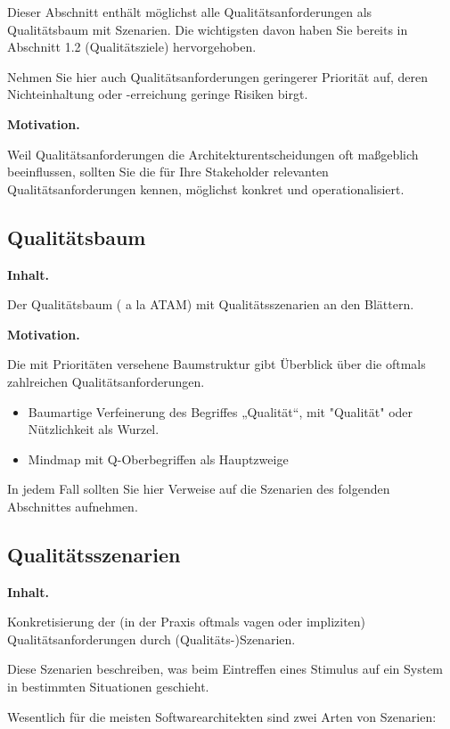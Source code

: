 \documentclass[]{article}
\begin{document}
Dieser Abschnitt enthält möglichst alle Qualitätsanforderungen als
Qualitätsbaum mit Szenarien. Die wichtigsten davon haben Sie bereits in
Abschnitt 1.2 (Qualitätsziele) hervorgehoben.

Nehmen Sie hier auch Qualitätsanforderungen geringerer Priorität auf,
deren Nichteinhaltung oder -erreichung geringe Risiken birgt.

\textbf{Motivation.}

Weil Qualitätsanforderungen die Architekturentscheidungen oft maßgeblich
beeinflussen, sollten Sie die für Ihre Stakeholder relevanten
Qualitätsanforderungen kennen, möglichst konkret und operationalisiert.

\subsection{Qualitätsbaum}\label{_qualit_tsbaum}

\textbf{Inhalt.}

Der Qualitätsbaum ( a la ATAM) mit Qualitätsszenarien an den Blättern.

\textbf{Motivation.}

Die mit Prioritäten versehene Baumstruktur gibt Überblick über die
oftmals zahlreichen Qualitätsanforderungen.

\begin{itemize}
\item
  Baumartige Verfeinerung des Begriffes „Qualität``, mit "Qualität" oder
  Nützlichkeit als Wurzel.
\item
  Mindmap mit Q-Oberbegriffen als Hauptzweige
\end{itemize}

In jedem Fall sollten Sie hier Verweise auf die Szenarien des folgenden
Abschnittes aufnehmen.

\subsection{Qualitätsszenarien}\label{_qualit_tsszenarien}

\textbf{Inhalt.}

Konkretisierung der (in der Praxis oftmals vagen oder impliziten)
Qualitätsanforderungen durch (Qualitäts-)Szenarien.

Diese Szenarien beschreiben, was beim Eintreffen eines Stimulus auf ein
System in bestimmten Situationen geschieht.

Wesentlich für die meisten Softwarearchitekten sind zwei Arten von
Szenarien:
\end{document}
